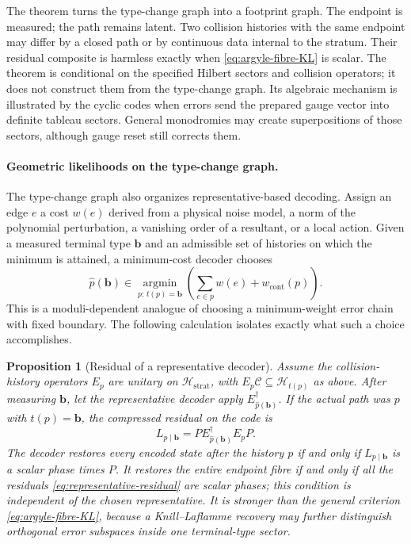 \documentclass[11pt]{article}
\newtheorem{proposition}[theorem]{Proposition}
\theoremstyle{definition}
\theoremstyle{remark}
\newcommand{\cH}{\mathcal H}
\newcommand{\cC}{\mathcal C}
\begin{document}
The theorem turns the type-change graph into a footprint graph.  The endpoint is measured; the path remains latent.  Two collision histories with the same endpoint may differ by a closed path or by continuous data internal to the stratum.  Their residual composite is harmless exactly when \eqref{eq:argyle-fibre-KL} is scalar.  The theorem is conditional on the specified Hilbert sectors and collision operators; it does not construct them from the type-change graph.  Its algebraic mechanism is illustrated by the cyclic codes when errors send the prepared gauge vector into definite tableau sectors.  General monodromies may create superpositions of those sectors, although gauge reset still corrects them.

\paragraph{Geometric likelihoods on the type-change graph.}

The type-change graph also organizes representative-based decoding.  Assign an edge $e$ a cost $w(e)$ derived from a physical noise model, a norm of the polynomial perturbation, a vanishing order of a resultant, or a local action.  Given a measured terminal type $\boldsymbol b$ and an admissible set of histories on which the minimum is attained, a minimum-cost decoder chooses
\begin{equation}\label{eq:argyle-decoder}
 \widehat p(\boldsymbol b)
 \in\operatorname*{argmin}_{p:\,t(p)=\boldsymbol b}
 \left(\sum_{e\in p}w(e)+w_{\mathrm{cont}}(p)\right).
\end{equation}
This is a moduli-dependent analogue of choosing a minimum-weight error chain with fixed boundary.  The following calculation isolates exactly what such a choice accomplishes.

\begin{proposition}[Residual of a representative decoder]\label{prop:representative-decoder}
Assume the collision-history operators $E_p$ are unitary on $\cH_{\mathrm{strat}}$, with $E_p\cC\subseteq\cH_{t(p)}$ as above.  After measuring $\boldsymbol b$, let the representative decoder apply $E_{\widehat p(\boldsymbol b)}^\dagger$.  If the actual path was $p$ with $t(p)=\boldsymbol b$, the compressed residual on the code is
\begin{equation}\label{eq:representative-residual}
 L_{p\mid\boldsymbol b}
 =P E_{\widehat p(\boldsymbol b)}^\dagger E_pP.
\end{equation}
The decoder restores every encoded state after the history $p$ if and only if $L_{p\mid\boldsymbol b}$ is a scalar phase times $P$.  It restores the entire endpoint fibre if and only if all the residuals \eqref{eq:representative-residual} are scalar phases; this condition is independent of the chosen representative.  It is stronger than the general criterion \eqref{eq:argyle-fibre-KL}, because a Knill--Laflamme recovery may further distinguish orthogonal error subspaces inside one terminal-type sector.
\end{proposition}
\end{document}
